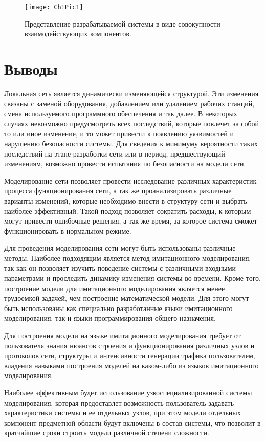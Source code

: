     \begin{figure}[h!]\center
        \texttt{[image: Ch1Pic1]}
        \caption{Представление разрабатываемой системы в виде совокупности взаимодействующих компонентов.} \label{Pic1}
    \end{figure}

\section{Выводы}

    Локальная сеть является динамически изменяющейся структурой. Эти изменения связаны с заменой оборудования, добавлением или удалением рабочих станций, смена используемого программного обеспечения и так далее. В некоторых случаях невозможно предусмотреть всех последствий, которые повлечет за собой то или иное изменение, и то может привести к появлению уязвимостей и нарушению безопасности системы. Для сведения к минимуму вероятности таких последствий на этапе разработки сети или в период, предшествующий изменениям, возможно провести испытания по безопасности на модели сети. 

    Моделирование сети позволяет провести исследование различных характеристик процесса функционирования сети, а так же проанализировать различные варианты изменений, которые необходимо внести в структуру сети и выбрать наиболее эффективный. Такой подход позволяет сократить расходы, к которым могут привести ошибочные решения, а так же время, за которое система сможет функционировать в нормальном режиме. 

    Для проведения моделирования сети могут быть использованы различные методы. Наиболее подходящим является метод имитационного моделирования, так как он позволяет изучить поведение системы с различными входными параметрами и проследить динамику изменения системы во времени. Кроме того, построение модели для имитационного моделирования является менее трудоемкой задачей, чем построение математической модели. Для этого могут быть использованы как специально разработанные языки имитационного моделирования, так и языки программирования общего назначения. 

    Для построения модели на языке имитационного моделирования требует от пользователя знания нюансов строения и функционирования различных узлов и протоколов сети, структуры и интенсивности генерации трафика пользователем, владения навыками построения моделей на каком-либо из языков имитационного моделирования. 

    Наиболее эффективным будет использование узкоспециализированной системы моделирования, которая предоставлет возможность пользователь задавать характеристики системы и ее отдельных узлов, при этом модели отдельных компонент предметной области будут включены в состав системы, что позволит в кратчайшие сроки строить модели различной степени сложности. 

